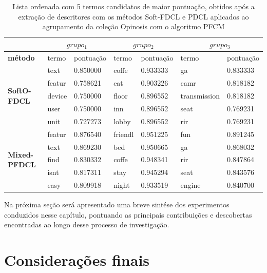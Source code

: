 \begin{table}[!h]
  \centering
  \begin{tabular}{ | l | l l | l l | l l |}
    \hline
    & \multicolumn{2}{c|}{$grupo_1$} & \multicolumn{2}{c|}{$grupo_2$} &
    \multicolumn{2}{c|}{$grupo_3$} \\
    \hline
    {\bf método} & termo & pontuação & termo & pontuação & termo & pontuação \\
    \hline
 \multirow{5}{*}{{\bf SoftO-FDCL}} & text   & 0.850000 & coffe  &  0.933333 &  ga     & 0.833333 \\
                                    & featur & 0.758621 & eat   &  0.903226 &  camr   & 0.818182 \\
                                    & device  & 0.750000 & floor   &  0.896552 &  transmission & 0.818182 \\
                                    & user   & 0.750000 & inn   &  0.896552 &  seat   & 0.769231 \\
                                    & unit   & 0.727273 & lobby  &  0.896552 &  rir    & 0.769231 \\
    \hline
 \multirow{5}{*}{{\bf Mixed-PFDCL}} & featur & 0.876540 & friendl & 0.951225 & fun & 0.891245  \\
&  text          &  0.869230  &  bed           &  0.950665  &  ga            &  0.868032  \\
&  find          &  0.830332  &  coffe          &  0.948341  &  rir           &  0.847864  \\
&  isnt           &  0.817311  &  stay           &  0.945294  &  seat          &  0.843576  \\
&  easy           &  0.809918  &  night         &  0.933519  &  engine         &  0.840700  \\
    \hline
  \end{tabular}
  \caption{Lista ordenada com 5 termos candidatos de maior pontuação, obtidos após a extração de
  descritores com os métodos Soft-FDCL e PDCL aplicados ao agrupamento da coleção Opinosis com o
algoritmo PFCM}
  \label{table:rankingmixedpdcl}
\end{table}

Na próxima seção será apresentado uma breve sintése dos experimentos conduzidos nesse capítulo,
pontuando as principais contribuições e descobertas encontradas ao longo desse processo de
investigação.

\section{Considerações finais}

